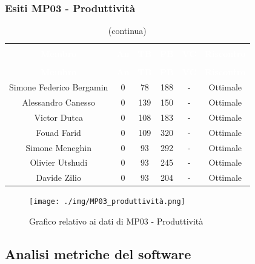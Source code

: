 \subsubsection{Esiti MP03 - Produttività} 
\begin{longtable}{c c c c c c}
\rowcolor{white}\caption{Esiti MP03 - Produttività} \\
		\rowcolor{redafk}
\textcolor{white}{\textbf{Membro}} &
\textcolor{white}{\textbf{An}} &
\textcolor{white}{\textbf{TB}} &
\textcolor{white}{\textbf{PB}} &
\textcolor{white}{\textbf{VC}} &
\textcolor{white}{\textbf{Riscontro}} \\
		\endfirsthead
		\rowcolor{white}\caption[]{(continua)} \\
		\rowcolor{redafk}
		\textcolor{white}{\textbf{Membro}} &
\textcolor{white}{\textbf{An}} &
\textcolor{white}{\textbf{TB}} &
\textcolor{white}{\textbf{PB}} &
\textcolor{white}{\textbf{VC}} &
\textcolor{white}{\textbf{Riscontro}} \\
		\endhead
Simone Federico Bergamin & 0 & 78 & 188 & - & Ottimale\\
Alessandro Canesso & 0 & 139 & 150 & - & Ottimale \\
Victor Dutca & 0 & 108 & 183 & - & Ottimale \\
Fouad Farid & 0 & 109 & 320 & - & Ottimale \\
Simone Meneghin & 0 & 93 & 292 & - & Ottimale\\
Olivier Utshudi & 0 & 93 & 245 & - & Ottimale\\
Davide Zilio & 0 & 93 & 204 & - & Ottimale\\
\end{longtable}

\begin{figure}[H]
\centering
\texttt{[image: ./img/MP03\_produttività.png]}
\caption{Grafico relativo ai dati di MP03 - Produttività}
\end{figure}

\subsection{Analisi metriche del software}
